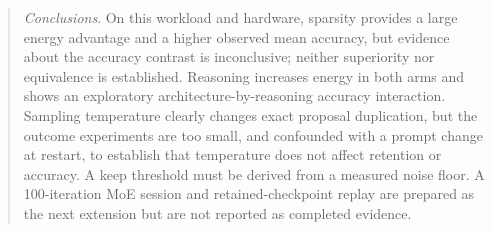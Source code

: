 \documentclass[sigconf,nonacm]{acmart}
\begin{document}
\begin{abstract}
\noindent \textit{Conclusions}.
On this workload and hardware, sparsity provides a large energy
advantage and a higher observed mean accuracy, but evidence about the accuracy
contrast is inconclusive; neither superiority nor equivalence is established. Reasoning increases energy in both
arms and shows an exploratory architecture-by-reasoning accuracy interaction.
Sampling temperature clearly changes exact proposal duplication, but the outcome
experiments are too small, and confounded with a prompt change at restart, to
establish that temperature does not affect retention or accuracy. A keep threshold
must be derived from a measured noise floor. A 100-iteration MoE session and
retained-checkpoint replay are prepared as the next extension but are not reported
as completed evidence.
\end{abstract}

\maketitle















\end{document}
